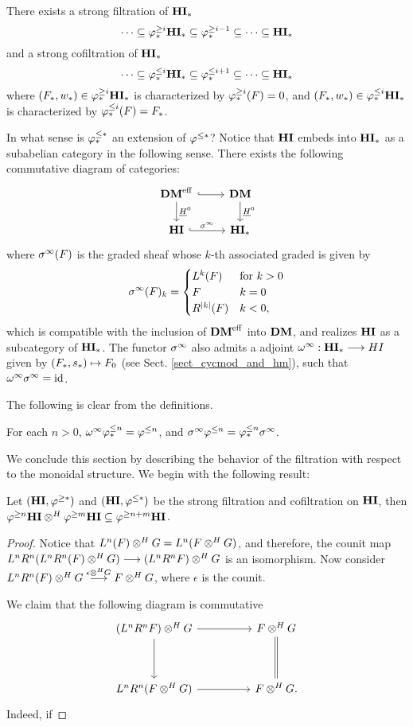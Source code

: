 \begin{cor}
There exists a strong filtration of $\mathbf{HI}_*$
\[
\cdots \subseteq \varphi^{\geq i}_{*}\mathbf{HI}_* \subseteq \varphi^{\geq i - 1}_{*} \subseteq 
   \cdots \subseteq \mathbf{HI}_*
\]
and a strong cofiltration of $\mathbf{HI}_*$
\[
\cdots \subseteq \varphi^{\leq i}_{*}\mathbf{HI}_* \subseteq \varphi^{\leq i + 1}_{*} \subseteq 
   \cdots \subseteq \mathbf{HI}_*
\]
where $(F_*, w_*) \in \varphi^{\geq i}_{*}\mathbf{HI}_*$ is characterized by
$\varphi^{\geq i}_{*}(F) = 0$, and $(F_*, w_*) \in \varphi^{\leq i}_{*}\mathbf{HI}_*$ is
characterized by $\varphi^{\leq i}_{*}(F) = F_*$.
\end{cor}
\noproof

In what sense is $\varphi^{\leq *}_{*}$ an extension of $\varphi^{\leq *}$? Notice that
$\mathbf{HI}$ embeds into $\mathbf{HI}_*$ as a subabelian category in the following 
sense. There exists the following commutative diagram of categories:
\[
\begin{tikzcd}
\DMeff \arrow[hookrightarrow]{r} \arrow{d}{\sheaf{H}^0} &
\DM \arrow{d}{\sheaf{H}^0} \\
\HI \arrow[hookrightarrow]{r}{\spectHI} &
\HM
\end{tikzcd}
\]
where $\sigma^\infty(F)$ is the graded sheaf whose $k$-th associated
graded is given by
\[
\sigma^\infty(F)_k = \begin{cases}
L^k(F)   & \textrm{for }k > 0 \\
F            & k = 0 \\
R^{|k|}(F) & k < 0,
\end{cases}
\]
which is compatible with the inclusion of $\mathbf{DM}^{\mathrm{eff}}$ into $\mathbf{DM}$,
and realizes $\mathbf{HI}$ as a subcategory of $\mathbf{HI}_*$. The functor 
$\sigma^\infty$ also admits a adjoint $\omega^\infty : \mathbf{HI}_* \longrightarrow HI$ given by 
$(F_*, s_*) \mapsto F_0$ (see Sect. \ref{sect_cycmod_and_hm}), 
such that $\omega^\infty \sigma^\infty = \mathrm{id}$.

The following is clear from the definitions.

\begin{prop}
For each $n > 0$, $\omega^\infty \varphi^{\leq n}_{*} = \varphi^{\leq n}$, and $\sigma^\infty 
\varphi^{\leq n} = \varphi^{\leq n}_{*} \sigma^\infty$.
\end{prop}

We conclude this section by describing the behavior of the 
filtration with respect to the monoidal structure. We begin
with the following result:

\begin{prop}\label{prop_tensor_and_tfilt}
Let $(\mathbf{HI}, \varphi^{\geq *})$ and $(\mathbf{HI}, \varphi^{\leq *})$ be the strong 
filtration and cofiltration on $\mathbf{HI}$, then $\varphi^{\geq n}\mathbf{HI} \otimes^H 
\varphi^{\geq m}\mathbf{HI} \subseteq \varphi^{\geq n + m}\mathbf{HI}$.
\end{prop}
\begin{proof}
Notice that $L^n(F) \otimes^H G = L^n(F \otimes^H G)$, and therefore, the
counit map $L^nR^n (L^nR^n(F) \otimes^H G) \longrightarrow (L^nR^nF) \otimes^H G$ is an
isomorphism. Now consider $L^nR^n(F) \otimes^H G \stackrel{\epsilon 
\otimes^H G}{\longrightarrow} F \otimes^H G$, where $\epsilon$ is the counit. 

We claim that the following diagram is commutative
\[
\begin{tikzcd}[column sep=huge, row sep=huge]
(L^nR^n F) \tHI G \arrow{r} \arrow{d} &
F \tHI G \arrow[equals]{d} \\
L^nR^n(F \tHI G) \arrow{r} &
F \tHI G.
\end{tikzcd}
\]
Indeed, if
\end{proof}
